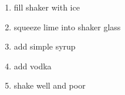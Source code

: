\documentclass[letter]{recipe}
\begin{document}

\begin{enumerate}
\addtolength{\itemindent}{2em}
\item fill shaker with ice
\item squeeze lime into shaker glass
  \item add simple syrup
  \item add vodka
 \item shake well and poor
\end{enumerate}
\end{document}
